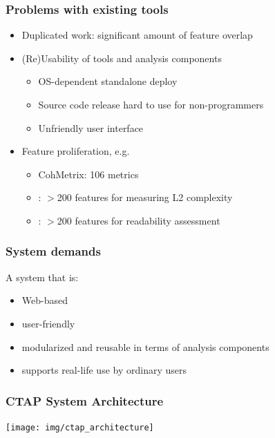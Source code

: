 \documentclass{beamer}
\begin{document}
	\begin{frame}
		\frametitle{Problems with existing tools}

		\begin{itemize}
			\item Duplicated work: significant amount of feature overlap
			\item (Re)Usability of tools and analysis components
				  \begin{itemize}
					  \item OS-dependent standalone deploy
					  \item Source code release hard to use for non-programmers
					  \item Unfriendly user interface
				  \end{itemize}
			\item Feature proliferation, e.g.
				  \begin{itemize}
					  \item CohMetrix: 106 metrics
					  \item \citet{Housen-15}: $>$200 features for measuring L2
					  complexity
					  \item \citet{Vajjala-15}: $>$200 features for readability
					  assessment
				  \end{itemize}
		\end{itemize}
	\end{frame}

	\begin{frame}
		\frametitle{System demands}

		A system that is: 

		\begin{itemize}
			\item Web-based
			\item user-friendly
			\item modularized and reusable in terms of analysis components
			\item supports real-life use by ordinary users
		\end{itemize}
	\end{frame}

	\begin{frame}
		\frametitle{CTAP System Architecture}

		\centering
		\texttt{[image: img/ctap\_architecture]}
	\end{frame}
\end{document}
